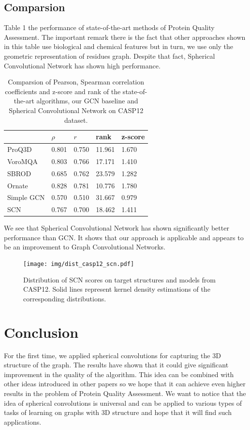 \documentclass[12pt,twoside]{article}
\begin{document}
	\subsection{Comparsion}
	Table 1 the performance of state-of-the-art methods of Protein Quality Assessment. The important remark there is
	the fact that other approaches shown in this table use biological and chemical features but in turn, we use only the geometric representation
	of residues graph. Despite that fact, Spherical Convolutional Network has shown high performance.
	\begin{center}
		\begin{table}[H]
			\centering
			\begin{tabular}{l|l|l|l|l}
				\hline
					   & $\rho$ &  $r$     &   rank       & z-score \\ \hline
			ProQ3D     & 0.801  &  0.750   &   11.961     & 1.670       \\
			VoroMQA    & 0.803  &  0.766   &   17.171     & 1.410       \\  
			SBROD      & 0.685  &  0.762   &   23.579     & 1.282       \\
			Ornate     & 0.828  &  0.781   &   10.776     & 1.780       \\
			Simple GCN & 0.570  &  0.510   &   31.667     & 0.979       \\
			SCN        & 0.767  &  0.700   &   18.462     & 1.411       
		\end{tabular}
		\caption{Comparsion of Pearson, Spearman correlation coefficients and z-score and rank of the state-of-the-art algorithms,
			our GCN baseline and Spherical Convolutional Network on CASP12 dataset.
			}
		\label{Tab:1}
		\end{table}
	\end{center}

	We see that Spherical Convolutional Network has shown significantly better performance than GCN. It shows that our approach
	is applicable and appears to be an improvement to Graph Convolutional Networks.

	\begin{figure}[h]
		\centering
		\texttt{[image: img/dist\_casp12\_scn.pdf]}
		\caption{Distribution of SCN scores on target structures and models from CASP12. Solid lines represent kernel density estimations of the corresponding distributions.
		}
		\label{fig:mesh1}
	\end{figure}

	\section{Conclusion}
	For the first time, we applied spherical convolutions for capturing the 3D structure of the graph. The results have shown that it could
	give significant improvement in the quality of the algorithm. This idea can be combined with other ideas introduced in other papers
	\cite{Pages2019}\cite{Baldassarre2020GRAPHQAPM}\cite{Uziela2016} so we hope that it can achieve even higher results in the problem
	of Protein Quality Assessment. We want to notice that the idea of spherical convolutions is universal and can be applied to
	various types of tasks of learning on graphs with 3D structure and hope that it will find such applications.
\end{document}
